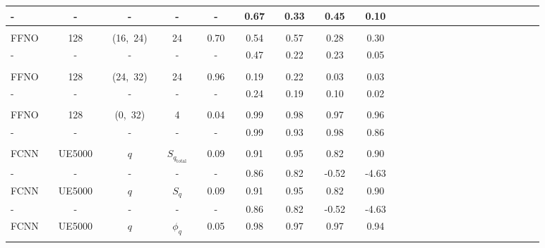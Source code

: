 \begin{table}[H]
\begin{tabular}{llclclclclclclclclclclclclclclcl}
-     		&  & -        &  & 	-		     &  & -        &  & -              &  & 0.67         &  & 0.33         &  & 0.45       &  & 0.10        \\  
\hline \\[-1.4em]
FFNO        &  & 128      &  & (16,\ 24)     &  & 24       &  & 0.70          &  & 0.54         &  & 0.57         &  & 0.28       &  & 0.30        \\ \rowcolor{Gray}
-     		&  & -        &  & 	-		     &  & -        &  & -              &  & 0.47         &  & 0.22         &  & 0.23       &  & 0.05        \\  
\hline \\[-1.4em]
FFNO        &  & 128      &  & (24,\ 32)     &  & 24       &  & 0.96          &  & 0.19         &  & 0.22         &  & 0.03       &  & 0.03        \\ \rowcolor{Gray}
-     		&  & -        &  & 	-		     &  & -        &  & -              &  & 0.24         &  & 0.19         &  & 0.10       &  & 0.02        \\  
\hline \\[-1.4em]
FFNO        &  & 128      &  & (0,\ 32)      &  & 4        &  & 0.04          &  & 0.99         &  & 0.98         &  & 0.97       &  & 0.96        \\ \rowcolor{Gray}
-     		&  & -        &  & 	-		     &  & -        &  & -              &  & 0.99         &  & 0.93         &  & 0.98       &  & 0.86        \\  [0.2em]
\hline \\[-1.4em]
FCNN        &  & UE5000          &  & $q$       &   & $S_{q_{\text{total}}}$     &  & 0.09      &  & 0.91       &  & 0.95     &  & 0.82      &  & 0.90         \\ \rowcolor{Blue}
-     		&  & -               &  & -            &   &  -                                       &  &  -           &  & 0.86      &  & 0.82     &  & -0.52     &  & -4.63        \\ 
FCNN        &  & UE5000          &  & $q$       &   & $S_q$                               &  & 0.09      &  & 0.91       &  & 0.95     &  & 0.82      &  & 0.90             \\ \rowcolor{Blue}
-     		&  & -               &  & -            &   &  -                                       &  &  -           &  & 0.86      &  & 0.82      &  & -0.52    &  & -4.63          \\ 
FCNN        &  & UE5000          &  & $q$       &   & $\phi_q $                          &  & 0.05      &  & 0.98      &  & 0.97      &  & 0.97      &  & 0.94             \\ \rowcolor{Blue}

\end{tabular}
\end{table}
